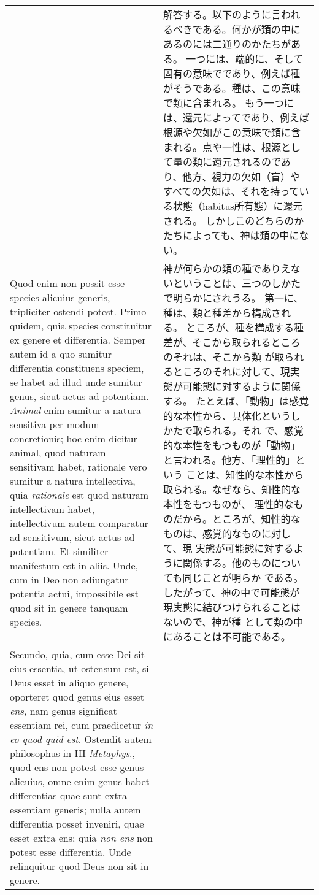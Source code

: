 \documentclass[10pt]{jsarticle} %
\begin{document}
\begin{longtable}{p{21em}p{21em}}
&
解答する。以下のように言われるべきである。何かが類の中にあるのには二通りのかたちがある。
一つには、端的に、そして固有の意味でであり、例えば種がそうである。種は、この意味で類に含まれる。
もう一つには、還元によってであり、例えば根源や欠如がこの意味で類に含まれる。点や一性は、根源として量の類に還元されるのであり、他方、視力の欠如（盲）やすべての欠如は、それを持っている状態（habitus所有態）に還元される。
しかしこのどちらのかたちによっても、神は類の中にない。

\\
Quod enim non possit esse species alicuius generis, tripliciter ostendi
 potest.  Primo quidem, quia species constituitur ex genere et
 differentia.  Semper autem id a quo sumitur differentia constituens
 speciem, se habet ad illud unde sumitur genus, sicut actus ad
 potentiam.  {\itshape Animal} enim sumitur a natura sensitiva per modum
 concretionis; hoc enim dicitur animal, quod naturam sensitivam habet,
 rationale vero sumitur a natura intellectiva, quia {\itshape rationale}
 est quod naturam intellectivam habet, intellectivum autem comparatur ad
 sensitivum, sicut actus ad potentiam. Et similiter manifestum est in
 aliis.  Unde, cum in Deo non adiungatur potentia actui, impossibile est
 quod sit in genere tanquam species.

&
神が何らかの類の種でありえないということは、三つのしかたで明らかにされうる。
第一に、種は、類と種差から構成される。
ところが、種を構成する種差が、そこから取られるところのそれは、そこから類
 が取られるところのそれに対して、現実態が可能態に対するように関係する。
たとえば、「動物」は感覚的な本性から、具体化というしかたで取られる。それ
 で、感覚的な本性をもつものが「動物」と言われる。他方、「理性的」という
 ことは、知性的な本性から取られる。なぜなら、知性的な本性をもつものが、
 理性的なものだから。ところが、知性的なものは、感覚的なものに対して、現
 実態が可能態に対するように関係する。他のものについても同じことが明らか
 である。
したがって、神の中で可能態が現実態に結びつけられることはないので、神が種
 として類の中にあることは不可能である。

\\

Secundo, quia, cum esse Dei sit eius essentia, ut ostensum est, si Deus
 esset in aliquo genere, oporteret quod genus eius esset {\itshape ens}, nam genus
 significat essentiam rei, cum praedicetur {\itshape in eo quod quid est}.
Ostendit autem philosophus in III {\itshape Metaphys}., quod ens non potest esse
 genus alicuius, omne enim genus habet differentias quae sunt extra
 essentiam generis; nulla autem differentia posset inveniri, quae esset
 extra ens; quia {\itshape non ens} non potest esse differentia.
Unde relinquitur quod Deus non sit in genere.


\end{longtable}
\end{document}
